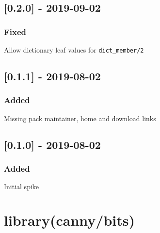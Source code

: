 \section{[0.2.0] - 2019-09-02}

\subsection{Fixed}

\begin{shortlist}
    \item Allow dictionary leaf values for \verb$dict_member/2$
\end{shortlist}

\section{[0.1.1] - 2019-08-02}

\subsection{Added}

\begin{shortlist}
    \item Missing pack maintainer, home and download links
\end{shortlist}

\section{[0.1.0] - 2019-08-02}

\subsection{Added}

\begin{shortlist}
    \item Initial spike
\end{shortlist}

\chapter{library(canny/bits)}\label{sec:bits}

